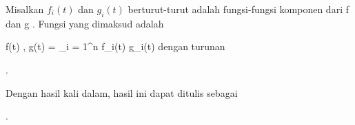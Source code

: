 
Misalkan $f_i(t)$ dan $g_i(t)$ berturut-turut adalah fungsi-fungsi komponen dari
\mathkor {} {f} {dan} {g} {.}
Fungsi yang dimaksud adalah

\mavergleichskettedisp
{\vergleichskette
{  \left\langle f(t) , g(t)  \right\rangle
}
{ =} { \sum_{i = 1}^n  f_i(t) g_i(t)
}
{ } {
}
{ } {
}
{ } {
}
}
{}{}{}
dengan turunan
 {} {}

 { . }

Dengan hasil kali dalam, hasil ini dapat ditulis sebagai

 { . }
